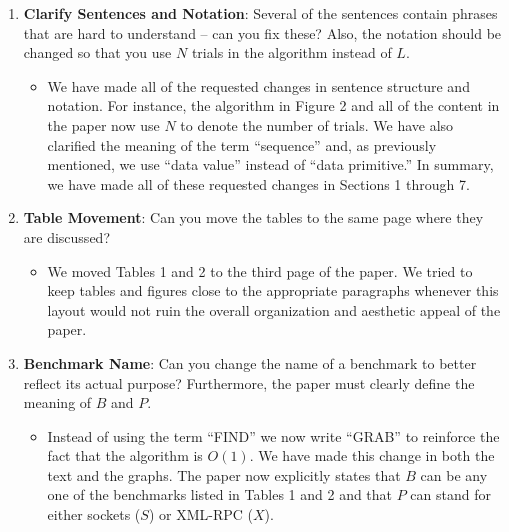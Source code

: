 \documentclass[11pt]{article}
\begin{document}
\begin{enumerate}
\begin{itemize}
    \end{itemize}

  \item {\bf Clarify Sentences and Notation}: Several of the sentences
    contain phrases that are hard to understand -- can you fix these?
    Also, the notation should be changed so that you use $N$ trials in
    the algorithm instead of $L$.

    \begin{itemize}

      \item We have made all of the requested changes in sentence
        structure and notation.  For instance, the algorithm in Figure
        2 and all of the content in the paper now use $N$ to denote
        the number of trials.  We have also clarified the meaning of
        the term ``sequence'' and, as previously mentioned, we use
        ``data value'' instead of ``data primitive.''  In summary, we
        have made all of these requested changes in Sections 1 through
        7.

    \end{itemize}

  \item {\bf Table Movement}: Can you move the tables to the same page
    where they are discussed?

    \begin{itemize}

      \item We moved Tables 1 and 2 to the third page of the paper.
        We tried to keep tables and figures close to the appropriate
        paragraphs whenever this layout would not ruin the overall
        organization and aesthetic appeal of the paper.

    \end{itemize}

  \item {\bf Benchmark Name}: Can you change the name of a benchmark to
    better reflect its actual purpose?  Furthermore, the paper must
    clearly define the meaning of $B$ and $P$.

    \begin{itemize}

      \item Instead of using the term ``FIND'' we now write ``GRAB''
        to reinforce the fact that the algorithm is $O(1)$.  We have
        made this change in both the text and the graphs.  The paper
        now explicitly states that $B$ can be any one of the
        benchmarks listed in Tables 1 and 2 and that $P$ can stand for
        either sockets ($S$) or XML-RPC ($X$).


\end{itemize}
\end{enumerate}
\end{document}
